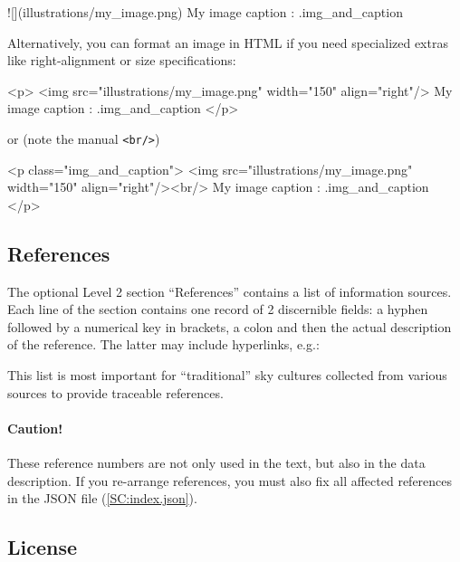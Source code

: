 \begin{configfile}[\scriptsize]
![](illustrations/my_image.png)
My image caption 
{: .img_and_caption }
\end{configfile}

Alternatively, you can format an image in HTML if you need specialized extras like right-alignment or size specifications:

\begin{configfile}[\scriptsize]
<p>
<img src="illustrations/my_image.png" width="150" align="right"/>
My image caption
{: .img_and_caption }
</p>
\end{configfile}

or (note the manual \texttt{<br/>})

\begin{configfile}[\scriptsize]
<p class="img_and_caption">
<img src="illustrations/my_image.png" width="150" align="right"/><br/>
My image caption
{: .img_and_caption }
</p>
\end{configfile}



\subsection{References}
\label{sec:skycultures:references}
\label{SC:references}

The optional Level 2 section ``References'' contains a list of information sources. 
Each line of the section contains one record of 2 discernible fields: 
a hyphen followed by a numerical key in brackets, 
a colon and then the actual description of the reference. The latter may include hyperlinks,
 e.g.:


This list is most important for ``traditional'' sky cultures collected from various sources to provide traceable references. 

\paragraph{Caution!} These reference numbers are not only used in the text, but also in the data description. If you re-arrange references, 
you must also fix all affected references in the JSON file (\ref{SC:index.json}).


\subsection{License}
\label{sec:skycultures:licenses}
\label{SC:license}

